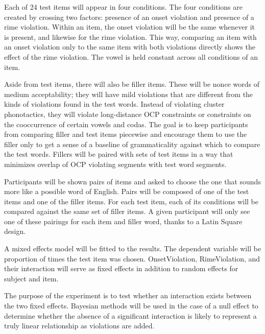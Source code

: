 Each of 24 test items will appear in four conditions. The four conditions are created by
crossing two factors: presence of an onset violation and presence of a rime
violation.  Within an item, the onset violation will be the same whenever it is
present, and likewise for the rime violation. This way, comparing an item with
an onset violation only to the same item with both violations directly shows
the effect of the rime violation. The vowel is held constant across all conditions of an item.

Aside from test items, there will also be filler items. These will be nonce words
of medium acceptability; they will have mild violations that are different from the
kinds of violations found in the test words. Instead of violating cluster phonotactics,
they will violate long-distance OCP constraints or constraints on the cooccurrence of certain
vowels and codas. The goal is to keep participants from comparing filler and test items
piecewise and encourage them to use the filler only to get a sense of a baseline of grammaticality
against which to compare the test words. Fillers will be paired with sets of test items in a way
that minimizes overlap of OCP violating segments with test word segments.

Participants will be shown pairs of items and asked to choose the one that sounds
more like a possible word of English. Pairs will be composed of one of the test items
and one of the filler items. For each test item, each of its conditions will be compared
against the same set of filler items. A given participant will only see one of these pairings
for each item and filler word, thanks to a Latin Square design.

A mixed effects model will be fitted to the results. The dependent variable
will be proportion of times the test item was chosen. OnsetViolation,
RimeViolation, and their interaction will serve as fixed effects in addition
to random effects for subject and item. %

The purpose of the experiment is to test whether an interaction exists between
the two fixed effects. Bayesian methods will be used in the case of a null effect
to determine whether the absence of a significant interaction is likely to represent
a truly linear relationship as violations are added.

